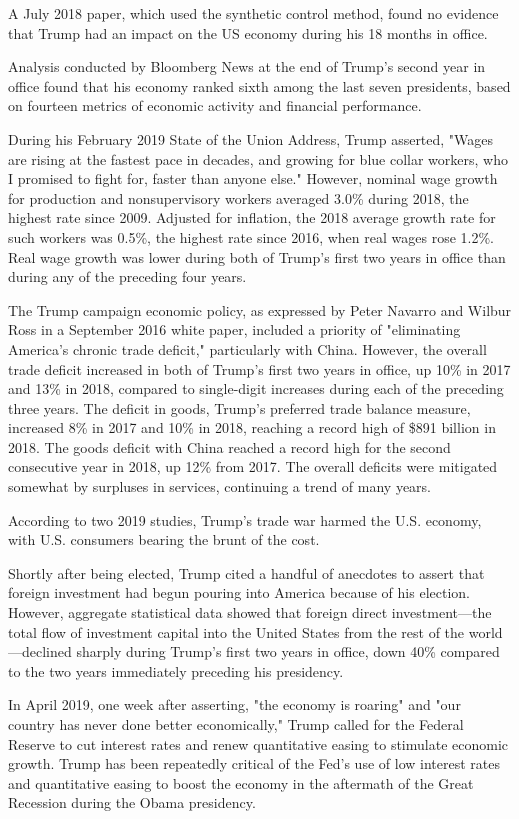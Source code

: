 A July 2018 paper, which used the synthetic control method, found no
evidence that Trump had an impact on the US economy during his 18 months
in office.

Analysis conducted by Bloomberg News at the end of Trump's second year
in office found that his economy ranked sixth among the last seven
presidents, based on fourteen metrics of economic activity and financial
performance.

During his February 2019 State of the Union Address, Trump asserted,
"Wages are rising at the fastest pace in decades, and growing for blue
collar workers, who I promised to fight for, faster than anyone else."
However, nominal wage growth for production and nonsupervisory workers
averaged 3.0\% during 2018, the highest rate since 2009. Adjusted for
inflation, the 2018 average growth rate for such workers was 0.5\%, the
highest rate since 2016, when real wages rose 1.2\%. Real wage growth
was lower during both of Trump's first two years in office than during
any of the preceding four years.

The Trump campaign economic policy, as expressed by Peter Navarro and
Wilbur Ross in a September 2016 white paper, included a priority of
"eliminating America's chronic trade deficit," particularly with China.
However, the overall trade deficit increased in both of Trump's first
two years in office, up 10\% in 2017 and 13\% in 2018, compared to
single-digit increases during each of the preceding three years. The
deficit in goods, Trump's preferred trade balance measure, increased 8\%
in 2017 and 10\% in 2018, reaching a record high of \$891 billion in
2018. The goods deficit with China reached a record high for the second
consecutive year in 2018, up 12\% from 2017. The overall deficits were
mitigated somewhat by surpluses in services, continuing a trend of many
years.

According to two 2019 studies, Trump's trade war harmed the U.S.
economy, with U.S. consumers bearing the brunt of the cost.

Shortly after being elected, Trump cited a handful of anecdotes to
assert that foreign investment had begun pouring into America because of
his election. However, aggregate statistical data showed that foreign
direct investment---the total flow of investment capital into the United
States from the rest of the world---declined sharply during Trump's
first two years in office, down 40\% compared to the two years
immediately preceding his presidency.

In April 2019, one week after asserting, "the economy is roaring" and
"our country has never done better economically," Trump called for the
Federal Reserve to cut interest rates and renew quantitative easing to
stimulate economic growth. Trump has been repeatedly critical of the
Fed's use of low interest rates and quantitative easing to boost the
economy in the aftermath of the Great Recession during the Obama
presidency.


